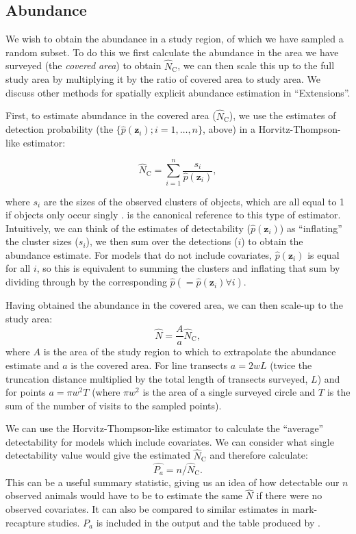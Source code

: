 \documentclass[article,shortnames]{jss}
\begin{document}
\subsection{Abundance}\label{abundance}

We wish to obtain the abundance in a study region, of which we have
sampled a random subset. To do this we first calculate the abundance in
the area we have surveyed (the \emph{covered area}) to obtain
\(\hat{N}_\text{C}\), we can then scale this up to the full study area
by multiplying it by the ratio of covered area to study area. We discuss
other methods for spatially explicit abundance estimation in
``Extensions''.

First, to estimate abundance in the covered area (\(\hat{N}_\text{C}\)),
we use the estimates of detection probability (the
\(\{\hat{p}(\mathbf{z}_i); i=1,\ldots,n\}\), above) in a
Horvitz-Thompson-like estimator:

\begin{equation}
\hat{N}_\text{C} = \sum_{i=1}^n\frac{s_i}{\hat{p}(\mathbf{z}_i)},
\label{ht}
\end{equation}

where \(s_i\) are the sizes of the observed clusters of objects, which
are all equal to 1 if objects only occur singly \citep{Borchers:2004wr}.
\citet{thompson2012sampling} is the canonical reference to this type of
estimator. Intuitively, we can think of the estimates of detectability
(\(\hat{p}(\mathbf{z}_i)\)) as ``inflating'' the cluster sizes
(\(s_i\)), we then sum over the detections (\(i\)) to obtain the
abundance estimate. For models that do not include covariates,
\(\hat{p}(\mathbf{z}_i)\) is equal for all \(i\), so this is equivalent
to summing the clusters and inflating that sum by dividing through by
the corresponding \(\hat{p} (=\hat{p}(\mathbf{z}_i) \forall i)\).

Having obtained the abundance in the covered area, we can then scale-up
to the study area: \[
\hat{N} = \frac{A}{a} \hat{N}_\text{C},
\] where \(A\) is the area of the study region to which to extrapolate
the abundance estimate and \(a\) is the covered area. For line transects
\(a=2wL\) (twice the truncation distance multiplied by the total length
of transects surveyed, \(L\)) and for points \(a=\pi w^2 T\) (where
\(\pi w^2\) is the area of a single surveyed circle and \(T\) is the sum
of the number of visits to the sampled points).

We can use the Horvitz-Thompson-like estimator to calculate the
``average'' detectability for models which include covariates. We can
consider what single detectability value would give the estimated
\(\hat{N}_\text{C}\) and therefore calculate: \[
\hat{P_a} = n/\hat{N}_\text{C}.
\] This can be a useful summary statistic, giving us an idea of how
detectable our \(n\) observed animals would have to be to estimate the
same \(\hat{N}\) if there were no observed covariates. It can also be
compared to similar estimates in mark-recapture studies. \(P_a\) is
included in the  output and the table produced by
.
\end{document}
